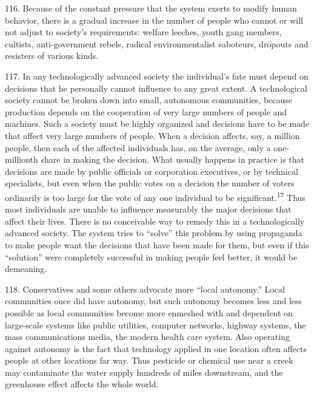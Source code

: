 \documentclass{article}
\begin{document}
116. Because of the constant pressure that the system exerts to modify human behavior, there is a 
gradual increase in the number of people who cannot or will not adjust to society’s requirements: 
welfare leeches, youth gang members, cultists, anti-government rebels, radical environmentalist 
saboteurs, dropouts and resisters of various kinds. \vspace{\baselineskip}

117. In any technologically advanced society the individual’s fate must depend on decisions that 
he personally cannot influence to any great extent. A technological society cannot be broken down 
into small, autonomous communities, because production depends on the cooperation of very large 
numbers of people and machines. Such a society must be highly organized and decisions have to 
be made that affect very large numbers of people. When a decision affects, say, a million people, 
then each of the affected individuals has, on the average, only a one-millionth share in making the 
decision. What usually happens in practice is that decisions are made by public officials or 
corporation executives, or by technical specialists, but even when the public votes on a decision 
the number of voters ordinarily is too large for the vote of any one individual to be significant.\textsuperscript{17} 
Thus most individuals are unable to influence measurably the major decisions that affect their 
lives. There is no conceivable way to remedy this in a technologically advanced society. The 
system tries to “solve” this problem by using propaganda to make people want the decisions that 
have been made for them, but even if this “solution” were completely successful in making people 
feel better, it would be demeaning. \vspace{\baselineskip}

118. Conservatives and some others advocate more “local autonomy.” Local communities once 
did have autonomy, but such autonomy becomes less and less possible as local communities 
become more enmeshed with and dependent on large-scale systems like public utilities, computer 
networks, highway systems, the mass communications media, the modern health care 
system. Also operating against autonomy is the fact that technology applied in one location often 
affects people at other locations far way. Thus pesticide or chemical use near a creek may 
contaminate the water supply hundreds of miles downstream, and the greenhouse effect affects the 
whole world. \vspace{\baselineskip}
 
\end{document}
